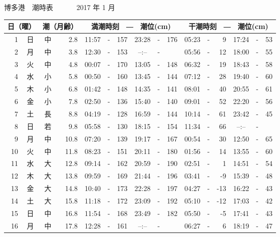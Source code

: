 \documentclass[12pt.a4j]{jsarticle}
\begin{document}
\pagestyle{empty}
 \begin{center}
 {\LARGE 博多港　潮時表　　　}
 {\large 2017 年  1 月}\\
 \begin{table}[ht]
    \begin{tabular}{|rc|cr|ccrccr|ccrccr|}
    \hline
    \multicolumn{2}{|c|}{日（曜）} & \multicolumn{2}{c|}{潮（月齢）} & \multicolumn{6}{c|}{満潮時刻　―　潮位(cm)} & \multicolumn{6}{c|}{干潮時刻　―　潮位(cm)} \\
 \hline
 1 & 日 & 中 &  2.8 &  11:57 &-& 157  &  23:28 &-& 176  &   05:23 &-&   9  &   17:24 &-&  53  \\
 2 & 月 & 中 &  3.8 &  12:30 &-& 153  &  --:-- &-&     &   05:56 &-&  12  &   18:00 &-&  55  \\
 3 & 火 & 中 &  4.8 &  00:07 &-& 170  &  13:05 &-& 148  &   06:32 &-&  19  &   18:43 &-&  58  \\
 4 & 水 & 小 &  5.8 &  00:50 &-& 160  &  13:45 &-& 144  &   07:12 &-&  28  &   19:40 &-&  60  \\
 5 & 木 & 小 &  6.8 &  01:42 &-& 148  &  14:35 &-& 141  &   08:01 &-&  40  &   20:55 &-&  61  \\
 6 & 金 & 小 &  7.8 &  02:50 &-& 136  &  15:40 &-& 140  &   09:01 &-&  52  &   22:20 &-&  56  \\
 7 & 土 & 長 &  8.8 &  04:19 &-& 128  &  16:59 &-& 144  &   10:14 &-&  61  &   23:42 &-&  45  \\
 8 & 日 & 若 &  9.8 &  05:58 &-& 130  &  18:15 &-& 154  &   11:34 &-&  66  &   --:-- &-&     \\
 9 & 月 & 中 & 10.8 &  07:20 &-& 139  &  19:17 &-& 167  &   00:54 &-&  30  &   12:50 &-&  65  \\
10 & 火 & 中 & 11.8 &  08:23 &-& 151  &  20:11 &-& 180  &   01:56 &-&  14  &   13:55 &-&  60  \\
11 & 水 & 大 & 12.8 &  09:14 &-& 162  &  20:59 &-& 190  &   02:51 &-&   1  &   14:51 &-&  54  \\
12 & 木 & 大 & 13.8 &  09:59 &-& 169  &  21:44 &-& 196  &   03:41 &-&  -9  &   15:39 &-&  48  \\
13 & 金 & 大 & 14.8 &  10:40 &-& 173  &  22:28 &-& 197  &   04:27 &-& -13  &   16:22 &-&  43  \\
14 & 土 & 大 & 15.8 &  11:18 &-& 172  &  23:09 &-& 192  &   05:10 &-& -12  &   17:03 &-&  42  \\
15 & 日 & 中 & 16.8 &  11:54 &-& 168  &  23:49 &-& 182  &   05:50 &-&  -5  &   17:41 &-&  43  \\
16 & 月 & 中 & 17.8 &  12:28 &-& 161  &  --:-- &-&     &   06:27 &-&   6  &   18:19 &-&  47  \\

\end{tabular}
\end{table}
\end{center}
\end{document}
